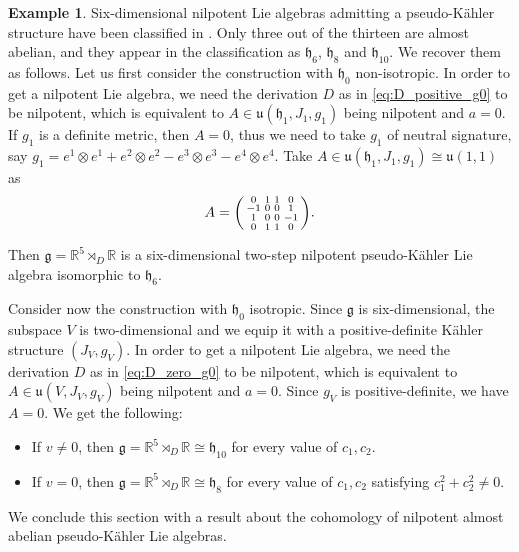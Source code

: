 \documentclass{article}
\theoremstyle{definition}
\newtheorem{example}[theorem]{Example}
\newcommand{\R}{\mathbb{R}}
\newcommand{\frg}{\mathfrak{g}}
\newcommand{\frh}{\mathfrak{h}}
\newenvironment{smallpmatrix}{\left(\begin{smallmatrix}}{\end{smallmatrix}\right)}
\begin{document}
\begin{example}\label{example:6d_nilpotent}
    Six-dimensional nilpotent Lie algebras admitting a pseudo-Kähler structure have been classified in \cite{CFU04}. Only three out of the thirteen are almost abelian, and they appear in the classification as $\frh_6$, $\frh_8$ and $\frh_{10}$. We recover them as follows. Let us first consider the construction with $\frh_0$ non-isotropic. In order to get a nilpotent Lie algebra, we need the derivation $D$ as in \eqref{eq:D_positive_g0} to be nilpotent, which is equivalent to $A\in\mathfrak{u}(\frh_1,J_1,g_1)$ being nilpotent and $a=0$. If $g_1$ is a definite metric, then $A=0$, thus we need to take $g_1$ of neutral signature, say $g_1=e^1\otimes e^1+e^2\otimes e^2-e^3\otimes e^3-e^4\otimes e^4$. Take $A\in\mathfrak{u}(\frh_1,J_1,g_1)\cong\mathfrak{u}(1,1)$ as $$A=\begin{smallpmatrix}
        0 & 1 & 1 & 0 \\
        -1 & 0 & 0 & 1 \\
        1 & 0 & 0 & -1 \\
        0 & 1 & 1 & 0
    \end{smallpmatrix}.$$

    Then $\frg=\R^5\rtimes_D\R$ is a six-dimensional two-step nilpotent pseudo-Kähler Lie algebra isomorphic to $\frh_6$.\medskip
    
    Consider now the construction with $\frh_0$ isotropic. Since $\frg$ is six-dimensional, the subspace $V$ is two-dimensional and we equip it with a positive-definite Kähler structure $(J_V,g_V)$. In order to get a nilpotent Lie algebra, we need the derivation $D$ as in \eqref{eq:D_zero_g0} to be nilpotent, which is equivalent to $A\in\mathfrak{u}(V,J_V,g_V)$ being nilpotent and $a=0$. Since $g_V$ is positive-definite, we have $A=0$. We get the following: \begin{itemize}
        \item If $v\neq0$, then $\frg=\R^5\rtimes_D\R\cong\frh_{10}$ for every value of $c_1,c_2$.
        \item If $v=0$, then $\frg=\R^5\rtimes_D\R\cong\frh_8$ for every value of $c_1,c_2$ satisfying $c_1^2+c_2^2\neq0$.
    \end{itemize}
\end{example}

We conclude this section with a result about the cohomology of nilpotent almost abelian pseudo-Kähler Lie algebras.\medskip
\end{document}

